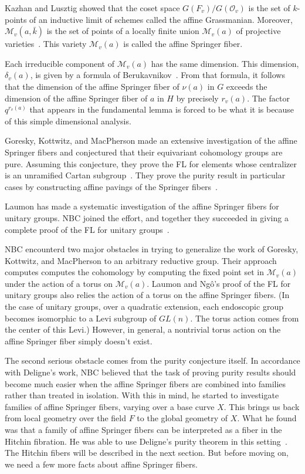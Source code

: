 \documentclass[brochure,english,12pt]{bourbaki}
\def\M{{\mathcal M}}
\def\O{{\mathcal O}}
\begin{document}
Kazhan and Lusztig showed that the coset space $G(F_v)/G(\O_v)$ is the
set of $k$-points of an inductive limit of schemes called the affine
Grassmanian.  Moreover, $\M_v(a,\bar k)$ is the set of points of a
locally finite union $\M_v(a)$ of projective varieties~\cite{KL:1988}.
This variety $\M_v(a)$ is called the affine Springer fiber.

Each irreducible component of $\M_v(a)$ has the same dimension.  This
dimension, $\delta_v(a)$, is given by a formula of
Berukavnikov~\cite{Bezrukavnikov}.  From that formula, it follows that
the dimension of the affine Springer fiber of $\nu(a)$ in $G$ exceeds
the dimension of the affine Springer fiber of $a$ in $H$ by precisely
$r_v(a)$.  The factor $q^{r_v(a)}$ that appears in the fundamental
lemma is forced to be what it is because of this simple dimensional
analysis.

Goresky, Kottwitz, and MacPherson made an extensive investigation of
the affine Springer fibers and conjectured that their equivariant
cohomology groups are pure.  Assuming this conjecture, they prove the
FL for elements whose centralizer is an unramified
Cartan subgroup~\cite{GKM:2004}.  They prove the purity result in particular cases by
constructing affine pavings of the Springer fibers~\cite{GKM:2006}.

Laumon has made a systematic investigation of
the affine Springer fibers for unitary groups.  NBC joined the effort, and together they
succeeded in giving a complete proof of the FL for unitary groups~\cite{LN:08}.

NBC encounterd two major obstacles in trying to generalize the work of
Goresky, Kottwitz, and MacPherson to an arbitrary reductive group.
Their approach computes computes the cohomology by computing the fixed
point set in $\M_v(a)$ under the action of a torus on $\M_v(a)$.  Laumon and
Ng\^o's proof of the FL for unitary groups also relies
the action of a torus on the affine Springer fibers.  (In the case of
unitary groups, over a quadratic extension, each
endoscopic group becomes isomorphic to a Levi subgroup of $GL(n)$.
The torus action comes from the center of this Levi.)  However, in
general, a nontrivial torus action on the affine Springer fiber simply
doesn't exist.

The second serious obstacle comes from the purity conjecture itself.
In accordance with Deligne's work, NBC believed that the task of
proving purity results should become much easier when the affine
Springer fibers are combined into families rather than treated in
isolation.  With this in mind, he started to investigate families of
affine Springer fibers, varying over a base curve $X$.  This brings us
back from local geometry over the field $F$ to the global geometry of
$X$.  What he found was that a family of affine Springer fibers can be
interpreted as a fiber in the Hitchin fibration.  He was able to use
Deligne's purity theorem in this setting~\cite{Deligne:Weil2}.  The
Hitchin fibers will be described in the next section.  But before
moving on, we need a few more facts about affine Springer fibers.
\end{document}

